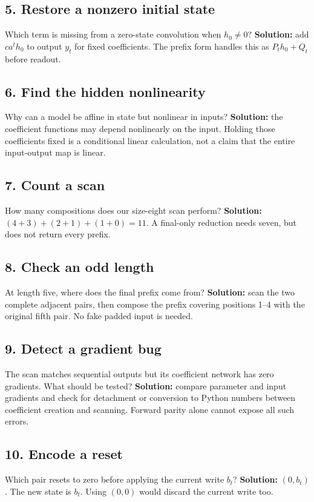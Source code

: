 \subsection*{5. Restore a nonzero initial state}
Which term is missing from a zero-state convolution when $h_0\ne0$?
\textbf{Solution:} add $ca^t h_0$ to output $y_t$ for fixed coefficients.
The prefix form handles this as $P_th_0+Q_t$ before readout.

\subsection*{6. Find the hidden nonlinearity}
Why can a model be affine in state but nonlinear in inputs?
\textbf{Solution:} the coefficient functions may depend nonlinearly on
the input. Holding those coefficients fixed is a conditional linear
calculation, not a claim that the entire input-output map is linear.

\subsection*{7. Count a scan}
How many compositions does our size-eight scan perform?
\textbf{Solution:} $(4+3)+(2+1)+(1+0)=11$.
A final-only reduction needs seven, but does not return every prefix.

\subsection*{8. Check an odd length}
At length five, where does the final prefix come from?
\textbf{Solution:} scan the two complete adjacent pairs, then compose
the prefix covering positions 1--4 with the original fifth pair.
No fake padded input is needed.

\subsection*{9. Detect a gradient bug}
The scan matches sequential outputs but its coefficient network has
zero gradients. What should be tested?
\textbf{Solution:} compare parameter and input gradients and check for
detachment or conversion to Python numbers between coefficient creation
and scanning. Forward parity alone cannot expose all such errors.

\subsection*{10. Encode a reset}
Which pair resets to zero before applying the current write $b_t$?
\textbf{Solution:} $(0,b_t)$. The new state is $b_t$.
Using $(0,0)$ would discard the current write too.


